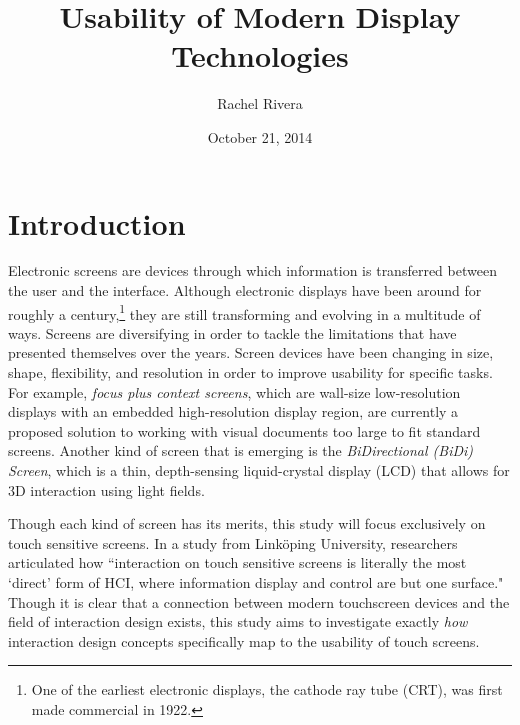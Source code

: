 \documentclass[11pt]{article}
\title{Usability of Modern Display Technologies}
\author{Rachel Rivera}
\date{October 21, 2014}
\begin{document}
\maketitle


\pagebreak
\tableofcontents


\pagebreak

%
%
\section{Introduction}
\label{introduction}

Electronic screens are devices through which information is transferred between the user and the interface. Although electronic displays have been around for roughly a century,\footnote{One of the earliest electronic displays, the cathode ray tube (CRT),  was first made commercial in 1922.\cite{Cathode}} they are still transforming and evolving in a multitude of ways. Screens are diversifying in order to tackle the limitations that have presented themselves over the years.\cite{Eisenberg} Screen devices have been changing in size, shape, flexibility, and resolution in order to improve usability for specific tasks. For example, \textit{focus plus context screens}, which are wall-size low-resolution displays with an embedded high-resolution display region, are currently a proposed solution to working with visual documents too large to fit standard screens.\cite{Baudisch} Another kind of screen that is emerging is the \textit{BiDirectional (BiDi) Screen}, which is a thin, depth-sensing liquid-crystal display (LCD) that allows for 3D interaction using light fields.\cite{Hirsch} 

 Though each kind of screen has its merits, this study will focus exclusively on touch sensitive screens. In a study from Link\"{o}ping University, researchers articulated how ``interaction on touch sensitive screens is literally the most `direct' form of HCI, where information display and control are but one surface."\cite{Albinsson} Though it is clear that a connection between modern touchscreen devices and the field of interaction design exists, this study aims to investigate exactly \textit{how} interaction design concepts specifically map to the usability of touch screens. 
\end{document}
